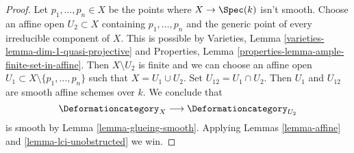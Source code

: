 \begin{proof}
Let $p_1, \ldots, p_n \in X$ be the points where $X \to \Spec(k)$
isn't smooth. Choose an affine open $U_2 \subset X$ containing
$p_1, \ldots, p_n$ and the generic point of every irreducible
component of $X$. This is possible by
Varieties, Lemma \ref{varieties-lemma-dim-1-quasi-projective}
and Properties, Lemma \ref{properties-lemma-ample-finite-set-in-affine}.
Then $X \setminus U_2$ is finite and we can choose an affine open
$U_1 \subset X \setminus \{p_1, \ldots, p_n\}$ such that
$X = U_1 \cup U_2$. Set $U_{12} = U_1 \cap U_2$.
Then $U_1$ and $U_{12}$ are smooth affine schemes over $k$.
We conclude that
$$
\Deformationcategory_X \longrightarrow \Deformationcategory_{U_2}
$$
is smooth by Lemma \ref{lemma-glueing-smooth}.
Applying Lemmas \ref{lemma-affine} and \ref{lemma-lci-unobstructed} we win.
\end{proof}










